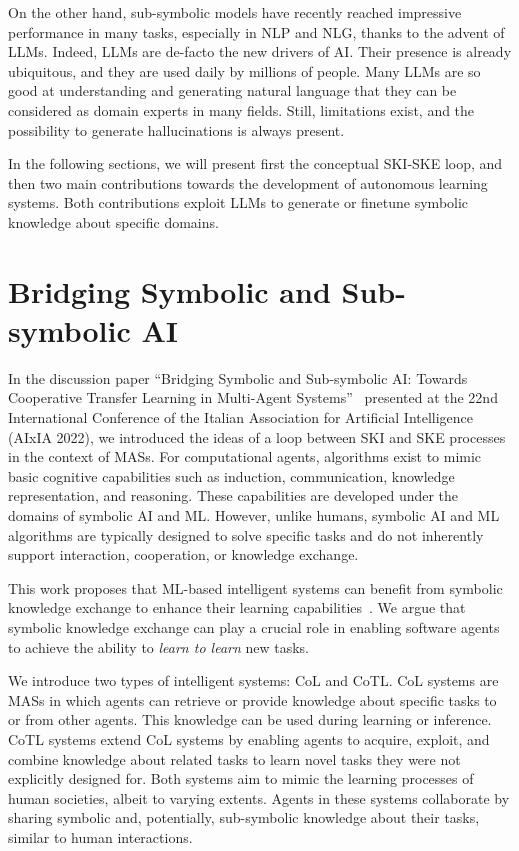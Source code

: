 On the other hand, sub-symbolic models have recently reached impressive performance in many tasks, especially in \gls{NLP} and \gls{NLG}, thanks to the advent of \glspl{LLM}.
%
Indeed, \glspl{LLM} are de-facto the new drivers of \gls{AI}.
%
Their presence is already ubiquitous, and they are used daily by millions of people.
%
Many \glspl{LLM} are so good at understanding and generating natural language that they can be considered as domain experts in many fields.
%
Still, limitations exist, and the possibility to generate hallucinations is always present.


In the following sections, we will present first the conceptual \gls{SKI}-\gls{SKE} loop, and then two main contributions towards the development of autonomous learning systems.
%
Both contributions exploit \glspl{LLM} to generate or finetune symbolic knowledge about specific domains.


\section{Bridging Symbolic and Sub-symbolic \gls{AI}}
\label{sec:cycle-ski-ske}
%
In the discussion paper ``Bridging Symbolic and Sub-symbolic AI: Towards Cooperative Transfer Learning in Multi-Agent Systems''~\cite{DBLP:conf/aiia/MagniniCO22} presented at the 22nd International Conference of the Italian Association for Artificial Intelligence (AIxIA 2022), we introduced the ideas of a loop between \gls{SKI} and \gls{SKE} processes in the context of \glspl{MAS}.
%
For computational agents, algorithms exist to mimic basic cognitive capabilities such as induction, communication, knowledge representation, and reasoning.
%
These capabilities are developed under the domains of symbolic \gls{AI} and \gls{ML}.
%
However, unlike humans, symbolic \gls{AI} and \gls{ML} algorithms are typically designed to solve specific tasks and do not inherently support interaction, cooperation, or knowledge exchange.


This work proposes that \gls{ML}-based intelligent systems can benefit from symbolic knowledge exchange to enhance their learning capabilities~\cite{imagination-extraamas2021,not-just-for-humans-omicini-2020,expectation-extraamas2021}.
%
We argue that symbolic knowledge exchange can play a crucial role in enabling software agents to achieve the ability to \emph{learn to learn} new tasks.


We introduce two types of intelligent systems: \gls{CoL} and \gls{CoTL}.
%
\Gls{CoL} systems are \glspl{MAS} in which agents can retrieve or provide knowledge about specific tasks to or from other agents.
%
This knowledge can be used during learning or inference.
%
\gls{CoTL} systems extend \gls{CoL} systems by enabling agents to acquire, exploit, and combine knowledge about related tasks to learn novel tasks they were not explicitly designed for.
%
Both systems aim to mimic the learning processes of human societies, albeit to varying extents.
%
Agents in these systems collaborate by sharing symbolic and, potentially, sub-symbolic knowledge about their tasks, similar to human interactions.

